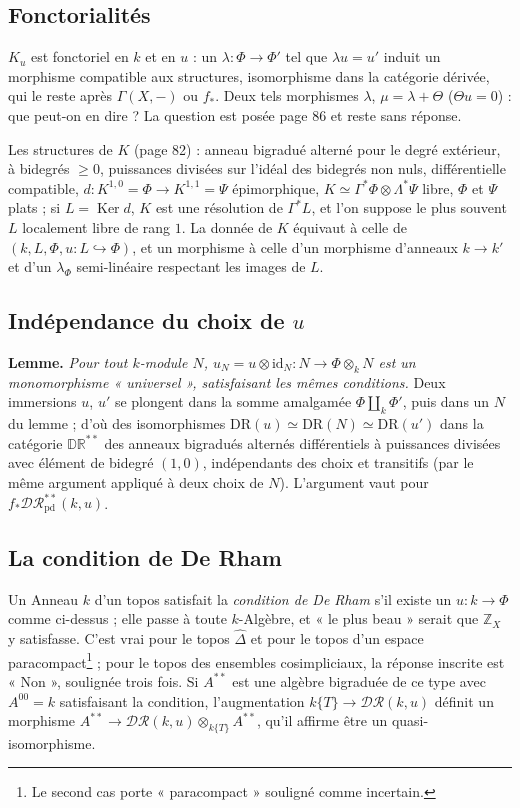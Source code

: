 \documentclass[11pt,a4paper]{article}
\begin{document}
\subsection*{Fonctorialités}

$K_u$ est fonctoriel en $k$ et en $u$ : un $\lambda : \Phi \to \Phi'$ tel que
$\lambda u = u'$ induit un morphisme compatible aux structures, isomorphisme
dans la catégorie dérivée, qui le reste après $\Gamma(X,-)$ ou $f_*$. Deux tels
morphismes $\lambda$, $\mu = \lambda + \Theta$ ($\Theta u = 0$) : que peut-on en
dire ? La question est posée page 86 et reste sans réponse.

Les structures de $K$ (page 82) : anneau bigradué alterné pour le degré
extérieur, à bidegrés $\geq 0$, puissances divisées sur l'idéal des bidegrés
non nuls, différentielle compatible, $d : K^{1,0} = \Phi \to K^{1,1} = \Psi$
épimorphique, $K \simeq \Gamma^*\Phi \otimes \Lambda^*\Psi$ libre,
$\Phi$ et $\Psi$ plats ; si $L = \operatorname{Ker} d$, $K$ est une résolution
de $\Gamma^*L$, et l'on suppose le plus souvent $L$ localement libre de rang
$1$. La donnée de $K$ équivaut à celle de $(k, L, \Phi, u : L \hookrightarrow
\Phi)$, et un morphisme à celle d'un morphisme d'anneaux $k \to k'$ et d'un
$\lambda_\Phi$ semi-linéaire respectant les images de $L$.

\subsection*{Indépendance du choix de $u$}

\textbf{Lemme.} \emph{Pour tout $k$-module $N$, $u_N = u \otimes \mathrm{id}_N
: N \to \Phi \otimes_k N$ est un monomorphisme « universel », satisfaisant les
mêmes conditions.} Deux immersions $u$, $u'$ se plongent dans la somme
amalgamée $\Phi \amalg_k \Phi'$, puis dans un $N$ du lemme ; d'où des
isomorphismes $\mathrm{DR}(u) \simeq \mathrm{DR}(N) \simeq \mathrm{DR}(u')$ dans
la catégorie $\mathbb{DR}^{**}$ des anneaux bigradués alternés différentiels à
puissances divisées avec élément de bidegré $(1,0)$, indépendants des choix et
transitifs (par le même argument appliqué à deux choix de $N$). L'argument
vaut pour $f_*\mathcal{DR}^{**}_{\mathrm{pd}}(k,u)$.

\subsection*{La condition de De Rham}

Un Anneau $k$ d'un topos satisfait la \emph{condition de De Rham} s'il existe un
$u : k \to \Phi$ comme ci-dessus ; elle passe à toute $k$-Algèbre, et « le plus
beau » serait que $\mathbb{Z}_X$ y satisfasse. C'est vrai pour le topos
$\widehat{\Delta}$ et pour le topos d'un espace paracompact\footnote{Le second
cas porte « paracompact » souligné comme incertain.} ; pour le topos des
ensembles cosimpliciaux, la réponse inscrite est « Non », soulignée trois fois.
Si $A^{**}$ est une algèbre bigraduée de ce type avec $A^{00} = k$ satisfaisant
la condition, l'augmentation $k\{T\} \to \mathcal{DR}(k,u)$ définit un morphisme
$A^{**} \to \mathcal{DR}(k,u) \otimes_{k\{T\}} A^{**}$, qu'il affirme être un
quasi-isomorphisme.
\end{document}

